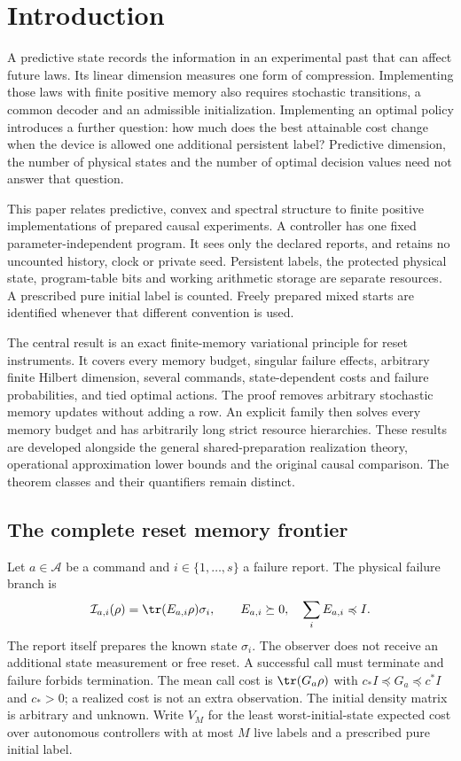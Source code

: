 \section{Introduction}\label{sec:current-overview}\label{sec:introduction}

A predictive state records the information in an experimental past that
can affect future laws.  Its linear dimension measures one form of
compression.  Implementing those laws with finite positive memory also
requires stochastic transitions, a common decoder and an admissible
initialization.  Implementing an optimal policy introduces a further
question: how much does the best attainable cost change when the device
is allowed one additional persistent label?  Predictive dimension,
the number of physical states and the number of optimal decision values
need not answer that question.

This paper relates predictive, convex and spectral structure to finite
positive implementations of prepared causal experiments.  A controller
has one fixed parameter-independent program.  It sees only the declared
reports, and retains no uncounted history, clock or private seed.
Persistent labels, the protected physical state, program-table bits and
working arithmetic storage are separate resources.  A prescribed pure
initial label is counted.  Freely prepared mixed starts are identified
whenever that different convention is used.

The central result is an exact finite-memory variational principle for
reset instruments.  It covers every memory budget, singular failure
effects, arbitrary finite Hilbert dimension, several commands,
state-dependent costs and failure probabilities, and tied optimal
actions.  The proof removes arbitrary stochastic memory updates without
adding a row.  An explicit family then solves every memory budget and
has arbitrarily long strict resource hierarchies.  These results are
developed alongside the general shared-preparation realization theory,
operational approximation lower bounds and the original causal
comparison.  The theorem classes and their quantifiers remain distinct.

\subsection*{The complete reset memory frontier}

Let $a\in\mathcal A$ be a command and $i\in\{1,\ldots,s\}$ a failure
report.  The physical failure branch is
\[
 \mathcal I_{a,i}(\rho)=\tr(E_{a,i}\rho)\sigma_i,
 \qquad E_{a,i}\succeq0,\quad \sum_iE_{a,i}\preccurlyeq I.
\]
The report itself prepares the known state $\sigma_i$.  The observer
does not receive an additional state measurement or free reset.  A
successful call must terminate and failure forbids termination.  The
mean call cost is $\tr(G_a\rho)$ with
$c_*I\preccurlyeq G_a\preccurlyeq c^*I$ and $c_*>0$; a realized cost is
not an extra observation.  The initial density matrix is arbitrary and
unknown.  Write $V_M$ for the least worst-initial-state expected cost
over autonomous controllers with at most $M$ live labels and a prescribed
pure initial label.

